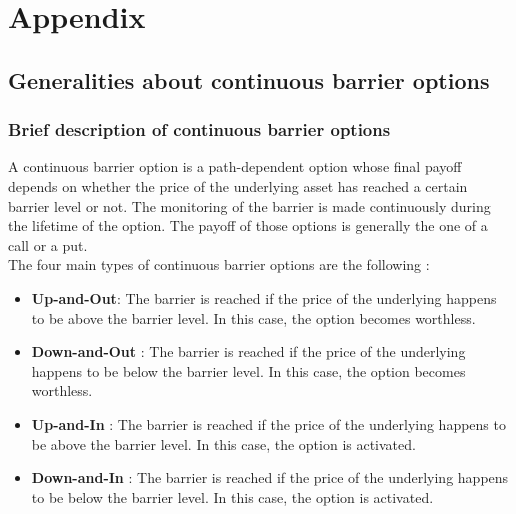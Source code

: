 \documentclass[a4paper,11pt,english]{book}
\let\cleardoublepage\clearpage
\begin{document}

\newpage
\begingroup
\let\clearpage\relax
\let\cleardoublepage\relax


\renewcommand{\thesection}{\Alph{section}}
\chapter*{Appendix}
\appendix
{}

\section{Generalities about continuous barrier options}
\label{appendix:down-in-put}

\subsection{Brief description of continuous barrier options}
A continuous barrier option is a path-dependent option whose final payoff depends on whether the price of the underlying asset has reached a certain barrier level or not. The monitoring of the barrier is made continuously during the lifetime of the option. The payoff of those options is generally the one of a call or a put.\\

The four main types of continuous barrier options are the following :
\begin{itemize}
    \item \textbf{Up-and-Out}: The barrier is reached if the price of the underlying happens to be above the barrier level. In this case, the option becomes worthless.
    \item \textbf{Down-and-Out} : The barrier is reached if the price of the underlying happens to be below the barrier level. In this case, the option becomes worthless.
    \item \textbf{Up-and-In} : The barrier is reached if the price of the underlying happens to be above the barrier level. In this case, the option is activated.
    \item \textbf{Down-and-In} : The barrier is reached if the price of the underlying happens to be below the barrier level. In this case, the option is activated.
\end{itemize}
\end{document}
